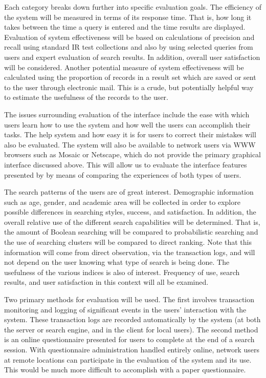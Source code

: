 Each category breaks down further into specific evaluation goals.  The
efficiency of the system will be measured in terms of its response
time.  That is, how long it takes between the time a query is entered
and the time results are displayed.  Evaluation of system
effectiveness will be based on calculations of precision and recall
using standard IR test collections and also by using selected queries
from users and expert evaluation of search results.  In addition,
overall user satisfaction will be considered.  Another potential
measure of system effectiveness will be calculated using the
proportion of records in a result set which are saved or sent to the
user through electronic mail.  This is a crude, but potentially
helpful way to estimate the usefulness of the records to the user.

The issues surrounding evaluation of the interface include the ease
with which users learn how to use the system and how well the users
can accomplish their tasks.  The help system and how easy it is for
users to correct their mistakes will also be evaluated. The system
will also be available to network users via WWW browsers such as
Mosaic or Netscape, which do not provide the primary graphical
interface discussed above. This will allow us to evaluate the
interface features presented by by means of comparing the experiences
of both types of users.

The search patterns of the users are of great interest.  Demographic
information such as age, gender, and academic area will be collected
in order to explore possible differences in searching styles, success,
and satisfaction.  In addition, the overall relative use of the
different search capabilities will be determined.  That is, the amount
of Boolean searching will be compared to probabilistic searching and
the use of searching clusters will be compared to direct ranking.
Note that this information will come from direct observation, via the
transaction logs, and will not depend on the user knowing what type of
search is being done. The usefulness of the various indices is also of
interest.  Frequency of use, search results, and user satisfaction in
this context will all be examined.

Two primary methods for evaluation will be used.  The first involves
transaction monitoring and logging of significant events in the users'
interaction with the system.  These transaction logs are recorded
automatically by the system (at both the server or search engine, and
in the client for local users).  The second method is an online
questionnaire presented for users to complete at the end of a search
session.  With questionnaire administration handled entirely online,
network users at remote locations can participate in the evaluation of
the system and its use. This would be much more difficult to
accomplish with a paper questionnaire.

